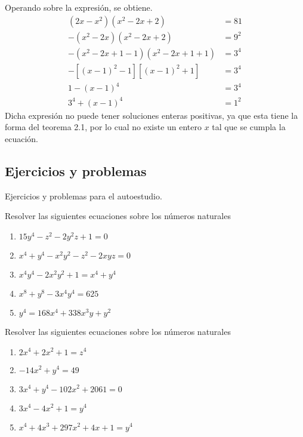 \begin{solution}
    Operando sobre la expresión, se obtiene.
    \begin{align*}
        (2x - x^2)(x^2 -2x + 2) &= 81 \\
        -(x^2 - 2x)(x^2 -2x + 2) &= 9^2 \\
        -(x^2 - 2x + 1 - 1)(x^2 -2x + 1 + 1) &= 3^4\\
        -\left[(x - 1)^2 - 1\right]\left[(x - 1)^2 + 1\right] &= 3^4\\
        1 - (x - 1)^4 &= 3^4\\
        3^4 + (x - 1)^4 &= 1^2
    \end{align*}
    Dicha expresión no puede tener soluciones enteras positivas, ya que esta tiene la forma del teorema 2.1, por lo cual no existe un entero $x$ tal que se cumpla la ecuación.
\end{solution}



\subsection{Ejercicios y problemas}
Ejercicios y problemas para el autoestudio.

\begin{exercise}
    Resolver las siguientes ecuaciones sobre los números naturales
    \begin{multicols}{2}
        \begin{enumerate}
            \item $15y^4 - z^2 - 2y^2 z + 1 = 0$
            \item $x^4 + y^4 - x^2 y^2 - z^2 - 2xyz = 0$
            \item $x^4 y^4 - 2x^2 y^2 + 1 = x^4 + y^4$
            \item $x^8 + y^8 - 3x^{4}y^4 = 625$
            \item $y^4 = 168x^4 + 338x^3 y + y^2$
        \end{enumerate}
    \end{multicols}
\end{exercise}

\begin{exercise}
    Resolver las siguientes ecuaciones sobre los números naturales
    \begin{multicols}{2}
        \begin{enumerate}
            \item $2x^4 + 2x^2 + 1 = z^4$
            \item $-14x^2 + y^4 = 49$
            \item $3x^4 + y^4 - 102x^2 + 2061 = 0$
            \item $3x^4 - 4x^2 + 1 = y^4$
            \item $x^4 + 4x^3 + 297x^2 + 4x + 1 = y^4$
        \end{enumerate}
    \end{multicols}
\end{exercise}

